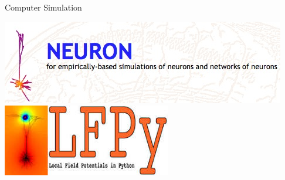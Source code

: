 \documentclass[aspectratio=169]{beamer}
\begin{document}
\begin{frame}{Computer Simulation}
    \begin{center}
        \includegraphics[width=.8\textwidth]{images/neuron_logo.jpg}
        \newline
        \includegraphics[width=.4\textwidth]{images/LFPy_logo.jpg}
    \end{center}
\end{frame}
\end{document}
